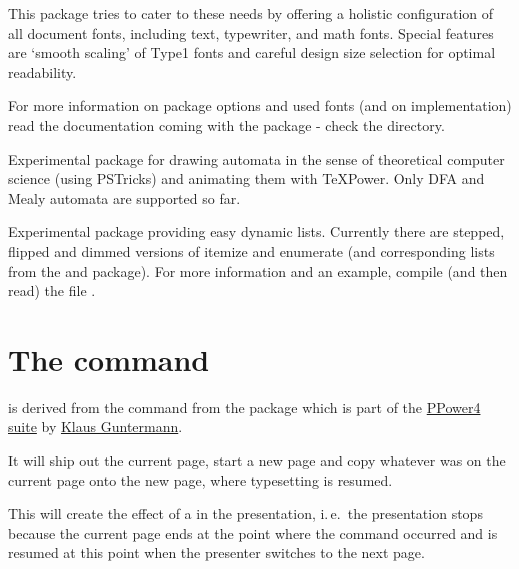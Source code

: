\documentclass[12pt]{scrartcl}
\let\newslide=\relax
\begin{document}
This package tries to cater to these needs by offering a holistic configuration of all document fonts, including text,
typewriter, and math fonts. Special features are `smooth scaling' of Type1 fonts and careful design size selection for
optimal readability.

\newslide

For more information on package options and used fonts (and on implementation) read the documentation coming with the
package - check the  directory.

Experimental package for drawing automata in the sense of theoretical computer
science (using PSTricks) and animating them with TeXPower.  Only DFA and Mealy
automata are supported so far.

\newslide

Experimental package providing easy dynamic lists. Currently there are stepped, flipped and dimmed versions of itemize
and enumerate (and corresponding lists from the  and  package).  For more information
and an example, compile (and then read) the file .

\newslide

%
\section{The  command}\label{Sec:pause}
 is derived from the  command from the package
\href{http://www-sp.iti.informatik.tu-darmstadt.de/software/ppower4/pp4sty.zip}{} which is part of the
\href{http://www-sp.iti.informatik.tu-darmstadt.de/software/ppower4/}{PPower4 suite} by
\href{mailto:guntermann@iti.informatik.tu-darmstadt.de}{Klaus Guntermann}.

  It will ship out the current page, start a new page and copy whatever was on the current page onto the new page, where
  typesetting is resumed.


  This will create the effect of a  in the presentation, i.\,e.\ the presentation stops because the
  current page ends at the point where the  command occurred and is resumed at this point when the
  presenter switches to the next page.
\end{document}
